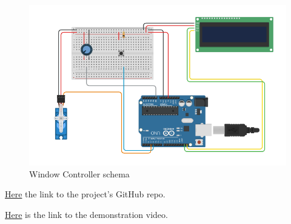 \documentclass[a4paper,12pt]{report}
\begin{document}
    \begin{figure}[H]
        \centering{}
            \includegraphics[width=\textwidth]{report/img/Assignment-03_SMT-Window-Subsystem.png}
        \caption{Window Controller schema}
        \label{img:window_schema}
    \end{figure}

    \centerline{\href{https://github.com/Cinels/IoT-assignment-03}{Here} the link to the project's GitHub repo.}
    \centerline{\href{}{Here} is the link to the demonstration video.}
    
\end{document}
